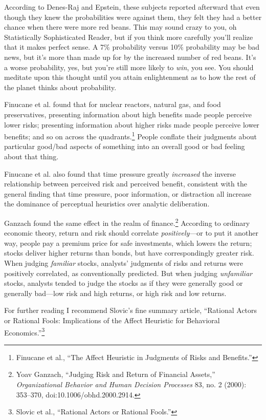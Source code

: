 {
 According to Denes-Raj and Epstein, these subjects reported
afterward that even though they knew the probabilities were against
them, they felt they had a better chance when there were more red
beans. This may sound crazy to you, oh Statistically Sophisticated
Reader, but if you think more carefully you'll realize
that it makes perfect sense. A 7\% probability versus 10\% probability
may be bad news, but it's more than made up for by the
increased number of red beans. It's a worse
probability, yes, but you're still more likely to
\textit{win}, you see. You should meditate upon this thought until you
attain enlightenment as to how the rest of the planet thinks about
probability.}

{
 Finucane et al. found that for nuclear reactors, natural gas, and
food preservatives, presenting information about high benefits made
people perceive lower risks; presenting information about higher risks
made people perceive lower benefits; and so on across the
quadrants.\footnote{Finucane et al., ``The Affect Heuristic in
Judgments of Risks and Benefits.''} People conflate their judgments about
particular good/bad aspects of something into an overall good or bad
feeling about that thing.}

{
 Finucane et al. also found that time pressure greatly
\textit{increased} the inverse relationship between perceived risk and
perceived benefit, consistent with the general finding that time
pressure, poor information, or distraction all increase the dominance
of perceptual heuristics over analytic deliberation.}

{
 Ganzach found the same effect in the realm of
finance.\footnote{Yoav Ganzach, ``Judging Risk and Return of
Financial Assets,'' \textit{Organizational Behavior
and Human Decision Processes} 83, no. 2 (2000): 353--370,
doi:10.1006/obhd.2000.2914.} According to ordinary economic theory,
return and risk should correlate \textit{positively}{}---or to put it
another way, people pay a premium price for safe investments, which
lowers the return; stocks deliver higher returns than bonds, but have
correspondingly greater risk. When judging \textit{familiar} stocks,
analysts' judgments of risks and returns were
positively correlated, as conventionally predicted. But when judging
\textit{unfamiliar} stocks, analysts tended to judge the stocks as if
they were generally good or generally bad---low risk and high returns,
or high risk and low returns.}

{
 For further reading I recommend Slovic's fine
summary article, ``Rational Actors or Rational Fools:
Implications of the Affect Heuristic for Behavioral
Economics.''\footnote{Slovic et al., ``Rational Actors or Rational
Fools.''}}

